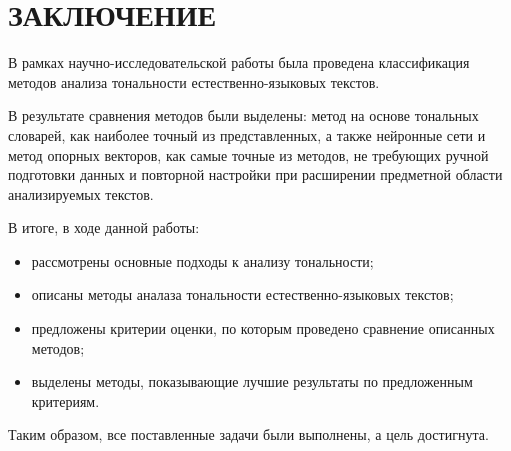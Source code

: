 \chapter*{ЗАКЛЮЧЕНИЕ}

В рамках научно-исследовательской работы была проведена классификация методов
анализа тональности естественно-языковых текстов.

В результате сравнения методов были выделены: метод на основе тональных
словарей, как наиболее точный из представленных, а также нейронные сети и метод
опорных векторов, как самые точные из методов, не требующих ручной подготовки
данных и повторной настройки при расширении предметной области анализируемых
текстов.

В итоге, в ходе данной работы:
\begin{itemize}
    \item рассмотрены основные подходы к анализу тональности;
    \item описаны методы аналаза тональности естественно-языковых текстов;
    \item предложены критерии оценки, по которым проведено сравнение
        описанных методов;
    \item выделены методы, показывающие лучшие результаты по предложенным
        критериям.
\end{itemize}

Таким образом, все поставленные задачи были выполнены, а цель достигнута.
